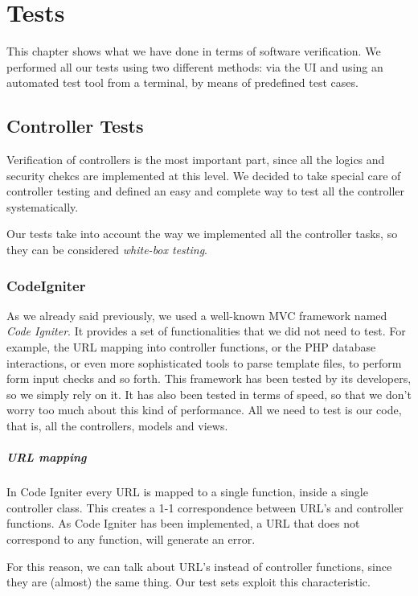\chapter{Tests}
This chapter shows what we have done in terms of software verification. We performed all our tests using two different methods: via the UI and using an automated test tool from a terminal, by means of predefined test cases.


\section{Controller Tests}
\label{subsec:controllertests}

Verification of controllers is the most important part, since all the logics and security chekcs are implemented at this level. We decided to take special care of controller testing and defined an easy and complete way to test all the controller systematically.

Our tests take into account the way we implemented all the controller tasks, so they can be considered \emph{white-box testing}. 

\subsection{CodeIgniter}
As we already said previously, we used a well-known MVC framework named \emph{Code Igniter}. It provides a set of functionalities that we did not need to test. For example, the URL mapping into controller functions, or the PHP database interactions, or even more sophisticated tools to parse template files, to perform form input checks and so forth. This framework has been tested by its developers, so we simply rely on it. It has also been tested in terms of speed, so that we don't worry too much about this kind of performance. All we need to test is our code, that is, all the controllers, models and views.

\paragraph{URL mapping}
In Code Igniter every URL is mapped to a single function, inside a single controller class. This creates a 1-1 correspondence between URL's and controller functions. As Code Igniter has been implemented, a URL that does not correspond to any function, will generate an error.

For this reason, we can talk about URL's instead of controller functions, since they are (almost) the same thing. Our test sets exploit this characteristic.

